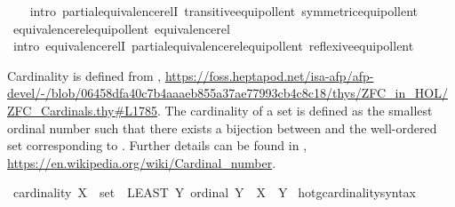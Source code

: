 \begin{isabellebody}
%
\isadelimproof
\ \ %
\endisadelimproof
%
\isatagproof
{}\isamarkupfalse%
\ {\isacharparenleft}{\kern0pt}intro\ partial{\isacharunderscore}{\kern0pt}equivalence{\isacharunderscore}{\kern0pt}relI\ transitive{\isacharunderscore}{\kern0pt}equipollent\ symmetric{\isacharunderscore}{\kern0pt}equipollent{\isacharparenright}{\kern0pt}%
\endisatagproof
{\isafoldproof}%
%
\isadelimproof
\isanewline
%
\endisadelimproof
\isanewline
{}\isamarkupfalse%
\ equivalence{\isacharunderscore}{\kern0pt}rel{\isacharunderscore}{\kern0pt}equipollent{\isacharcolon}{\kern0pt}\ {\isachardoublequoteopen}equivalence{\isacharunderscore}{\kern0pt}rel\ {\isacharparenleft}{\kern0pt}{\isasymapprox}{\isacharparenright}{\kern0pt}{\isachardoublequoteclose}\isanewline
%
\isadelimproof
\ \ %
\endisadelimproof
%
\isatagproof
{}\isamarkupfalse%
\ {\isacharparenleft}{\kern0pt}intro\ equivalence{\isacharunderscore}{\kern0pt}relI\ partial{\isacharunderscore}{\kern0pt}equivalence{\isacharunderscore}{\kern0pt}rel{\isacharunderscore}{\kern0pt}equipollent\ reflexive{\isacharunderscore}{\kern0pt}equipollent{\isacharparenright}{\kern0pt}%
\endisatagproof
{\isafoldproof}%
%
\isadelimproof
%
\endisadelimproof
%
\isadelimdocument
%
\endisadelimdocument
%
\isatagdocument
%
\isamarkuptrue%
%
\endisatagdocument
{\isafolddocument}%
%
\isadelimdocument
%
\endisadelimdocument
%
\begin{isamarkuptext}%
Cardinality is defined from \cite{ZFC_in_HOL_AFP}, \url{https://foss.heptapod.net/isa-afp/afp-devel/-/blob/06458dfa40c7b4aaaeb855a37ae77993cb4c8c18/thys/ZFC_in_HOL/ZFC_Cardinals.thy\#L1785}.
 The cardinality of a set  is defined as the
smallest ordinal number \isa{{\isasymalpha}} such that there 
exists a bijection between  and the well-ordered set corresponding to \isa{{\isasymalpha}}.
Further details can be found in \cite{ZFC_in_HOL_AFP}, \url{https://en.wikipedia.org/wiki/Cardinal_number}.%
\end{isamarkuptext}\isamarkuptrue%
\isamarkupfalse%
\ {\isachardoublequoteopen}cardinality\ {\isacharparenleft}{\kern0pt}X\ {\isacharcolon}{\kern0pt}{\isacharcolon}{\kern0pt}\ set{\isacharparenright}{\kern0pt}\ {\isasymequiv}\ {\isacharparenleft}{\kern0pt}LEAST\ Y{\isachardot}{\kern0pt}\ ordinal\ Y\ {\isasymand}\ X\ {\isasymapprox}\ Y{\isacharparenright}{\kern0pt}{\isachardoublequoteclose}\isanewline
\isanewline
{}\isamarkupfalse%
\ hotg{\isacharunderscore}{\kern0pt}cardinality{\isacharunderscore}{\kern0pt}syntax\ \ \isamarkupfalse%

\end{isabellebody}
